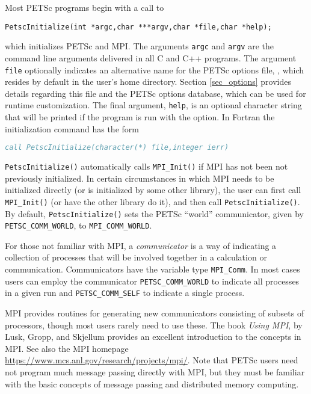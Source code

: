 Most PETSc programs begin with a call to
\begin{lstlisting}
PetscInitialize(int *argc,char ***argv,char *file,char *help);
\end{lstlisting}
which initializes PETSc and MPI.  The arguments \lstinline{argc} and
\lstinline{argv} are the command line arguments delivered in all C and C++
programs.  The argument \lstinline{file}
optionally indicates an alternative name for the PETSc options file,
, which resides by default in the user's home directory.
Section \ref{sec_options} provides details regarding
this file and the PETSc options database, which can be used for runtime
customization. The final argument, \lstinline{help}, is an optional
character string that will be printed if the program is run with the
 option.  In Fortran the initialization command has the form
\begin{lstlisting}[language=fortran]
call PetscInitialize(character(*) file,integer ierr)
\end{lstlisting}
\lstinline{PetscInitialize()} automatically calls \lstinline{MPI_Init()} if MPI
has not been not previously initialized. In certain 
circumstances in which MPI needs to be initialized directly (or is
initialized by some other library), the user can first call
\lstinline{MPI_Init()} (or have the other library do it), and then call
\lstinline{PetscInitialize()}.
By default, \lstinline{PetscInitialize()} sets the PETSc ``world''
communicator, given by \lstinline{PETSC_COMM_WORLD}, to \lstinline{MPI_COMM_WORLD}.

For those not familiar with MPI, a {\em communicator} is a way of
indicating a collection of processes that will be involved together
in a calculation or communication. Communicators have the variable type
\lstinline{MPI_Comm}. In most cases users can employ the communicator
\lstinline{PETSC_COMM_WORLD} to indicate all processes in a given run and
\lstinline{PETSC_COMM_SELF} to indicate a single process.

MPI provides routines
for generating new communicators consisting of subsets of processors,
though most users rarely need to use these. The book {\em Using MPI},
by Lusk, Gropp, and Skjellum \cite{using-mpi} provides an excellent
introduction to the concepts in MPI. See also the MPI homepage
\href{https://www.mcs.anl.gov/research/projects/mpi/}{https://www.mcs.anl.gov/research/projects/mpi/}.
Note that PETSc users need not program much message passing directly
with MPI, but they must be familiar with the basic concepts of message
passing and distributed memory computing.

